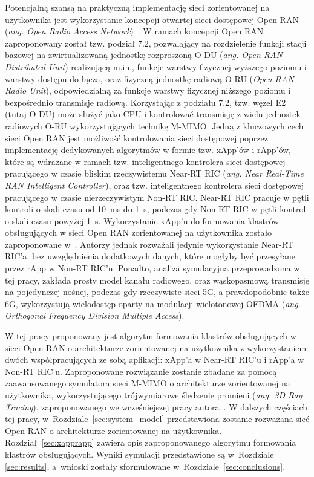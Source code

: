\documentclass[a4paper]{article}
\begin{document}
\begin{multicols}{2}
Potencjalną szansą na praktyczną implementację sieci zorientowanej na użytkownika jest wykorzystanie koncepcji otwartej sieci dostępowej Open RAN (\textit{ang. Open Radio Access Network})~\cite{Ranjbar2022}. W ramach koncepcji Open RAN zaproponowany został tzw. podział 7.2, pozwalający na rozdzielenie funkcji stacji bazowej na zwirtualizowaną jednostkę rozproszoną O-DU (\textit{ang. Open RAN Distributed Unit}) realizującą m.in., funkcje warstwy fizycznej wyższego poziomu i warstwy dostępu do łącza, oraz fizyczną jednostkę radiową O-RU (\textit{Open RAN Radio Unit}), odpowiedzialną za funkcje warstwy fizycznej niższego poziomu i bezpośrednio transmisje radiową. Korzystając z podziału 7.2, tzw. węzeł E2 (tutaj O-DU) może służyć jako CPU i kontrolować transmisję z wielu jednostek radiowych O-RU wykorzystujących technikę M-MIMO. Jedną z kluczowych cech sieci Open RAN jest możliwość kontrolowania sieci dostępowej poprzez implementację dedykowanych algorytmów w formie tzw. xApp'ów i rApp'ów, które są wdrażane w ramach tzw. inteligentnego kontrolera sieci dostępowej pracującego w czasie bliskim rzeczywistemu Near-RT RIC (\textit{ang. Near Real-Time RAN Intelligent Controller}), oraz tzw. inteligentnego kontrolera sieci dostępowej pracującego w czasie nierzeczywistym Non-RT RIC. Near-RT RIC pracuje w pętli kontroli o skali czasu od 10~ms do 1~s, podczas gdy Non-RT RIC w pętli kontroli o skali czasu powyżej 1~s. Wykorzystanie xApp'u do formowania klastrów obsługujących w sieci Open RAN zorientowanej na użytkownika zostało zaproponowane w~\cite{Beerten2022}. Autorzy jednak rozważali jedynie wykorzystanie Near-RT RIC'a, bez uwzględnienia dodatkowych danych, które mogłyby być przesyłane przez rApp w Non-RT RIC'u. Ponadto, analiza symulacyjna przeprowadzona w tej pracy, zakłada prosty model kanału radiowego, oraz wąskopasmową transmisję na pojedynczej nośnej, podczas gdy rzeczywiste sieci 5G, a prawdopodobnie także 6G, wykorzystują wielodostęp oparty na modulacji wielotonowej OFDMA (\textit{ang. Orthogonal Frequency Division Multiple Access}).

W tej pracy proponowany jest algorytm formowania klastrów obsługujących w sieci Open RAN o architekturze zorientowanej na użytkownika z wykorzystaniem dwóch współpracujących ze sobą aplikacji: xApp'a w Near-RT RIC'u i rApp'a w Non-RT RIC'u. Zaproponowane rozwiązanie zostanie zbadane za pomocą zaawansowanego symulatora sieci M-MIMO o architekturze zorientowanej na użytkownika, wykorzystującego trójwymiarowe śledzenie promieni (\textit{ang. 3D Ray Tracing}), zaproponowanego we wcześniejszej pracy autora~\cite{hoffmann2024}. W dalszych częściach tej pracy, w~Rozdziale~\ref{sec:system_model} przedstawiona zostanie rozważana sieć Open RAN o architekturze zorientowanej na użytkownika. Rozdział~\ref{sec:xapprapp} zawiera opis zaproponowanego algorytmu formowania klastrów obsługujących. Wyniki symulacji przedstawione są w~Rozdziale \ref{sec:results}, a~wnioski zostały sformułowane w~Rozdziale~\ref{sec:conclusions}.


\end{multicols}
\end{document}
